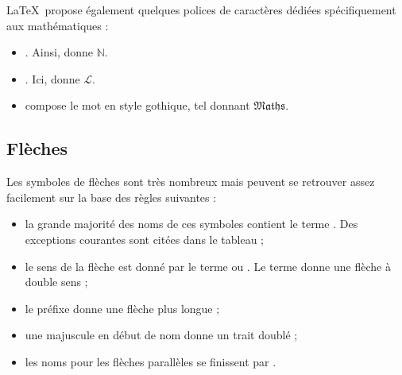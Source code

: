 \LaTeX\ propose également quelques polices de caractères dédiées spécifiquement aux mathématiques :
\begin{itemize}
\item {}. Ainsi,  donne $\mathbb{N}$.
\item {}. Ici,  donne $\mathcal{L}$.
\item {} compose le mot en style gothique, tel  donnant $\mathfrak{Maths}$.
\end{itemize}

\subsection{Flèches}

Les symboles de flèches sont très nombreux mais peuvent se retrouver assez facilement sur la base des règles suivantes :
\begin{itemize}
\item la grande majorité des noms de ces symboles contient le terme . Des exceptions courantes sont citées dans le tableau ;
\item le sens de la flèche est donné par le terme  ou . Le terme  donne une flèche à double sens ;
\item le préfixe  donne une flèche plus longue ; 
\item une majuscule en début de nom donne un trait doublé ;
\item les noms pour les flèches parallèles se finissent par .
\end{itemize}

